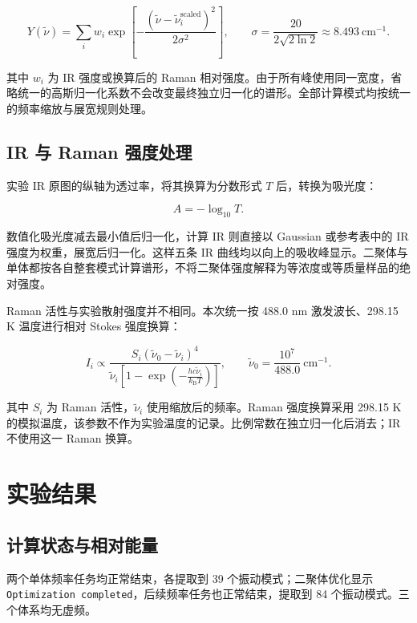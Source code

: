 \documentclass[a4paper,12pt]{article}
\begin{document}
\[
Y(\tilde\nu)=\sum_i w_i\exp\left[-\frac{(\tilde\nu-\tilde\nu_i^{\mathrm{scaled}})^2}{2\sigma^2}\right],
\qquad
\sigma=\frac{20}{2\sqrt{2\ln 2}}\approx8.493\ \mathrm{cm^{-1}}.
\]

其中 $w_i$ 为 IR 强度或换算后的 Raman 相对强度。由于所有峰使用同一宽度，省略统一的高斯归一化系数不会改变最终独立归一化的谱形。全部计算模式均按统一的频率缩放与展宽规则处理。

\subsection{IR 与 Raman 强度处理}

实验 IR 原图的纵轴为透过率，将其换算为分数形式 $T$ 后，转换为吸光度：

\[
A=-\log_{10}T.
\]

数值化吸光度减去最小值后归一化，计算 IR 则直接以 Gaussian 或参考表中的 IR 强度为权重，展宽后归一化。这样五条 IR 曲线均以向上的吸收峰显示。二聚体与单体都按各自整套模式计算谱形，不将二聚体强度解释为等浓度或等质量样品的绝对强度。

Raman 活性与实验散射强度并不相同。本次统一按 488.0 nm 激发波长、298.15 K 温度进行相对 Stokes 强度换算：

\[
I_i\propto
\frac{S_i(\tilde\nu_0-\tilde\nu_i)^4}
{\tilde\nu_i\left[1-\exp\left(-\frac{hc\tilde\nu_i}{k_{\mathrm B}T}\right)\right]},
\qquad
\tilde\nu_0=\frac{10^7}{488.0}\ \mathrm{cm^{-1}}.
\]

其中 $S_i$ 为 Raman 活性，$\tilde\nu_i$ 使用缩放后的频率。Raman 强度换算采用 298.15 K 的模拟温度，该参数不作为实验温度的记录。比例常数在独立归一化后消去；IR 不使用这一 Raman 换算。

\section{实验结果}

\subsection{计算状态与相对能量}

两个单体频率任务均正常结束，各提取到 39 个振动模式；二聚体优化显示 \nolinkurl{Optimization completed}，后续频率任务也正常结束，提取到 84 个振动模式。三个体系均无虚频。
\end{document}
